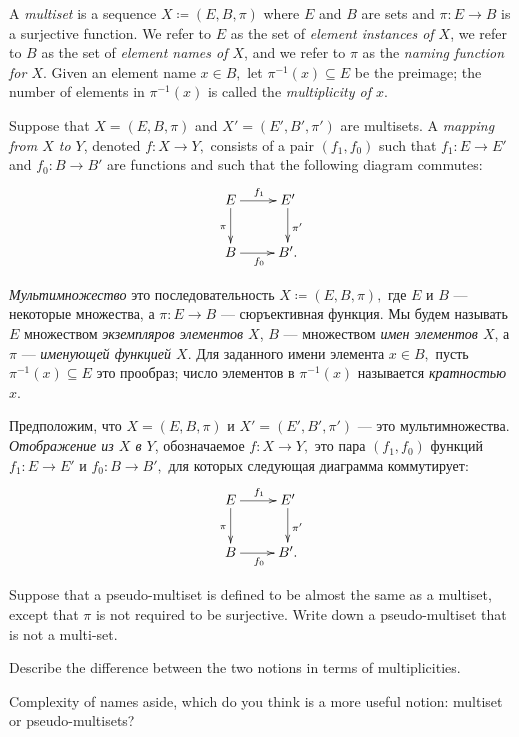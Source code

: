 \documentclass[../main/CT4S-EN-RU]{subfiles}
\begin{document}
\begin{definitionENG}\label{def:multiset}
A {\em multiset} is a sequence $X{\coloneqq}(E,B,\pi)$ where $E$ and $B$ are sets and $\pi\colon E{→} B$ is a surjective function. We refer to $E$ as the set of {\em element instances of $X$}, we refer to $B$ as the set of {\em element names of $X$}, and we refer to $\pi$ as the {\em naming function for $X$}. Given an element name $x\in B,$ let $\pi^{-1}(x)\subseteq E$ be the preimage; the number of elements in $\pi^{-1}(x)$ is called the {\em multiplicity of $x$}.

Suppose that $X=(E,B,\pi)$ and $X'=(E',B',\pi')$ are multisets. A {\em mapping from $X$ to $Y$}, denoted $f\colon X{→} Y,$ consists of a pair $(f_1,f_0)$ such that $f_1\colon E{→} E'$ and $f_0\colon B{→} B'$ are functions and such that the following diagram commutes:
\begin{align}\label{dia:multiset map}
\xymatrix{E\ar[r]^{f_1}\ar[d]_{\pi}&E'\ar[d]^{\pi'}\\B\ar[r]_{f_0}&B'.}
\end{align}
\end{definitionENG}

\begin{definitionRUS}\label{def:multiset}
{\em Мультимножество} это последовательность $X{\coloneqq}(E,B,\pi),$ где $E$ и $B$ — некоторые множества, а $\pi\colon E{→} B$ — сюръективная функция. Мы будем называть $E$ множеством {\em экземпляров элементов $X$}, $B$ — множеством {\em имен элементов $X$}, а $\pi$ — {\em именующей функцией $X$}. Для заданного имени элемента $x\in B,$ пусть $\pi^{-1}(x)\subseteq E$ это прообраз; число элементов в $\pi^{-1}(x)$ называется {\em кратностью $x$}.

Предположим, что $X=(E,B,\pi)$ и $X'=(E',B',\pi')$ — это мультимножества. {\em Отображение из $X$ в $Y$}, обозначаемое $f\colon X{→} Y,$ это пара $(f_1,f_0)$ функций $f_1\colon E{→} E'$ и $f_0\colon B{→} B',$ для которых следующая диаграмма коммутирует:
\begin{align}\label{dia:multiset map}
\xymatrix{E\ar[r]^{f_1}\ar[d]_{\pi}&E'\ar[d]^{\pi'}\\B\ar[r]_{f_0}&B'.}
\end{align}
\end{definitionRUS}

\begin{exerciseENG}
Suppose that a pseudo-multiset is defined to be almost the same as a multiset, except that $\pi$ is not required to be surjective. 
\sexc Write down a pseudo-multiset that is not a multi-set. 
\item Describe the difference between the two notions in terms of multiplicities. 
\item Complexity of names aside, which do you think is a more useful notion: multiset or pseudo-multisets? 
\endsexc
\end{exerciseENG}
\end{document}
